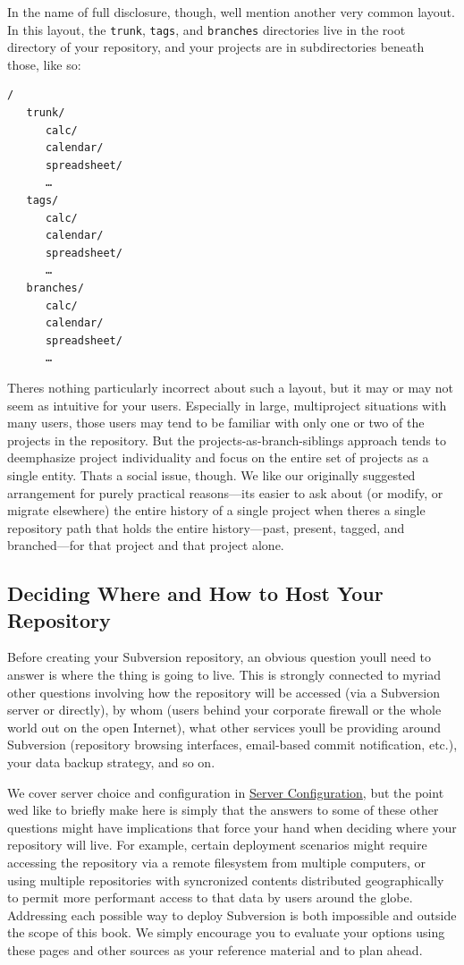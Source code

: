 In the name of full disclosure, though, we\textquotesingle ll mention
another very common layout. In this layout, the \texttt{trunk},
\texttt{tags}, and \texttt{branches} directories live in the root
directory of your repository, and your projects are in subdirectories
beneath those, like so:

\begin{verbatim}
/
   trunk/
      calc/
      calendar/
      spreadsheet/
      …
   tags/
      calc/
      calendar/
      spreadsheet/
      …
   branches/
      calc/
      calendar/
      spreadsheet/
      …
\end{verbatim}

There\textquotesingle s nothing particularly incorrect about such a
layout, but it may or may not seem as intuitive for your users.
Especially in large, multiproject situations with many users, those
users may tend to be familiar with only one or two of the projects in
the repository. But the projects-as-branch-siblings approach tends to
deemphasize project individuality and focus on the entire set of
projects as a single entity. That\textquotesingle s a social issue,
though. We like our originally suggested arrangement for purely
practical reasons---it\textquotesingle s easier to ask about (or modify,
or migrate elsewhere) the entire history of a single project when
there\textquotesingle s a single repository path that holds the entire
history---past, present, tagged, and branched---for that project and
that project alone.

\subsection{Deciding Where and How to Host Your
Repository}\label{svn.reposadmin.basics.hosting}

Before creating your Subversion repository, an obvious question
you\textquotesingle ll need to answer is where the thing is going to
live. This is strongly connected to myriad other questions involving how
the repository will be accessed (via a Subversion server or directly),
by whom (users behind your corporate firewall or the whole world out on
the open Internet), what other services you\textquotesingle ll be
providing around Subversion (repository browsing interfaces, email-based
commit notification, etc.), your data backup strategy, and so on.

We cover server choice and configuration in
\hyperref[svn.serverconfig]{Server Configuration}, but the point
we\textquotesingle d like to briefly make here is simply that the
answers to some of these other questions might have implications that
force your hand when deciding where your repository will live. For
example, certain deployment scenarios might require accessing the
repository via a remote filesystem from multiple computers, or using
multiple repositories with syncronized contents distributed
geographically to permit more performant access to that data by users
around the globe. Addressing each possible way to deploy Subversion is
both impossible and outside the scope of this book. We simply encourage
you to evaluate your options using these pages and other sources as your
reference material and to plan ahead.

